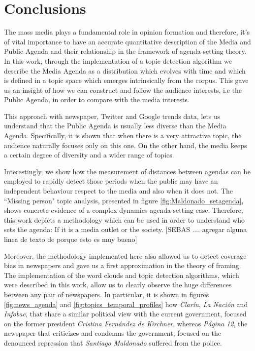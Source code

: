 \documentclass{bmcart}
\begin{document}
\section*{Conclusions}


\par The mass media plays a fundamental role in opinion formation and therefore, it’s of vital importance to have an accurate quantitative description of the Media and Public Agenda and their relationship in the framework of agenda-setting theory. In this work, through the implementation of a topic detection algorithm we describe the Media Agenda as a distribution which evolves with time and which is defined in a topic space which emerges intrinsically from the corpus. This gave us an insight of how we can construct and follow the audience interests, i.e the Public Agenda, in order to compare with the media interests. 

\par This approach with newspaper, Twitter and Google trends data, lets us understand that the Public Agenda is usually less diverse than the Media Agenda. Specifically, it is shown that when there is a very attractive topic, the audience naturally focuses only on this one. On the other hand, the media keeps a certain degree of diversity and a wider range of topics. 

\par Interestingly, we show how the measurement of distances between agendas can be employed to rapidly detect those periods when the public may have an independent behaviour respect to the media and also when it does not. The ``Missing person" topic analysis, presented in figure  \ref{fig:Maldonado_setagenda}, shows concrete evidence of a complex dynamics agenda-setting case. Therefore, this work depicts a methodology which can be used in order to understand who sets the agenda: If it is a media outlet or the society.  [SEBAS .... agregar alguna linea de texto de porque esto es muy bueno]
 
\par Moreover, the methodology implemented here also allowed us to detect coverage bias in newspapers and gave us a first approximation in the theory of framing. The implementation of the word clouds and topic detection algorithms, which were described in this work, allow us to clearly observe the huge differences between any pair of newspapers. In particular, it is shown in figures \ref{fig:news_agenda} and \ref{fig:topics_temporal_profiles}  how \emph{Clarín}, \emph{La Nación} and \emph{Infobae}, that share a similar political view with the current government, focused on the former president \emph{Cristina Fern\'andez de Kirchner}, whereas \emph{P\'agina 12}, the newspaper that  criticizes and condemns the government, focused on the denounced repression that \emph{Santiago Maldonado} suffered from the police. 
\end{document}
